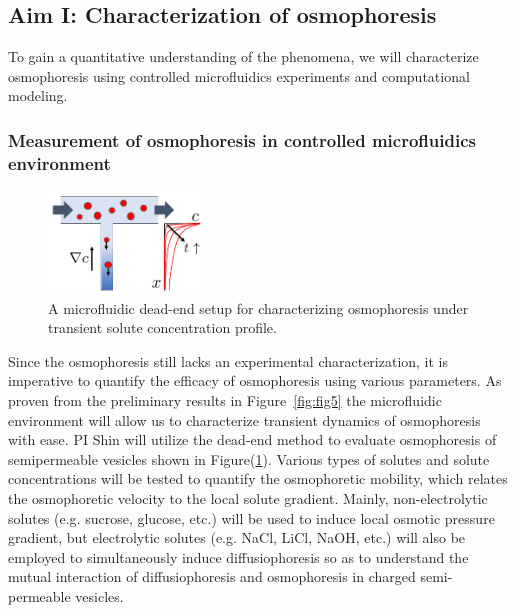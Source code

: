 \documentclass[11pt]{article}
\begin{document}
\subsection{Aim I: Characterization of osmophoresis}
\label{subsec:aim1}
To gain a quantitative understanding of the phenomena, we will
characterize osmophoresis using controlled microfluidics experiments and
computational modeling.

\subsubsection{Measurement of osmophoresis in controlled microfluidics
environment}
\label{subsubsec:measurement_osmophoresis}
\begin{figure}
\centerline{\includegraphics[width=1.6in]{figs/Microfluidic_dead-end.pdf}}
\caption{\label{fig:Microfluidic_dead-end} A microfluidic dead-end setup
  for characterizing osmophoresis under transient solute concentration
  profile.}
\end{figure}
%
Since the osmophoresis still lacks an experimental characterization, it
is imperative to quantify the efficacy of osmophoresis using various
parameters. As proven from the preliminary results in
Figure~\ref{fig:fig5} the microfluidic environment will allow us to
characterize transient dynamics of osmophoresis with ease.  PI Shin will
utilize the dead-end method to evaluate osmophoresis of semipermeable
vesicles shown in Figure(\ref{fig:Microfluidic_dead-end}).  Various
types of solutes and solute concentrations will be tested to quantify
the osmophoretic mobility, which relates the osmophoretic velocity to
the local solute gradient.  Mainly, non-electrolytic solutes (e.g.
sucrose, glucose, etc.) will be used to induce local osmotic pressure
gradient, but electrolytic solutes (e.g. NaCl, LiCl, NaOH, etc.) will
also be employed to simultaneously induce diffusiophoresis so as to
understand the mutual interaction of diffusiophoresis and osmophoresis
in charged semi-permeable vesicles.
\end{document}
